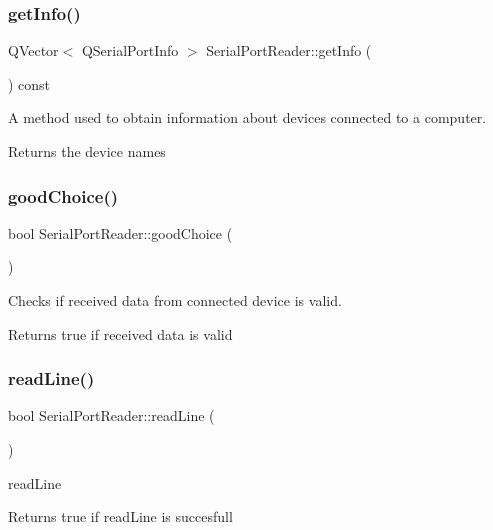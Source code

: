 \subsubsection{get\+Info()}
{\footnotesize\ttfamily Q\+Vector$<$ Q\+Serial\+Port\+Info $>$ Serial\+Port\+Reader\+::get\+Info (\begin{DoxyParamCaption}{ }\end{DoxyParamCaption}) const}



A method used to obtain information about devices connected to a computer. 

\begin{DoxyReturn}{Returns}
the device names 
\end{DoxyReturn}
\mbox{\label{class_serial_port_reader_aba5b7292f941e824467f5b1134f7f15f}} 
\subsubsection{good\+Choice()}
{\footnotesize\ttfamily bool Serial\+Port\+Reader\+::good\+Choice (\begin{DoxyParamCaption}{ }\end{DoxyParamCaption})\hspace{0.3cm}{\ttfamily [private]}}



Checks if received data from connected device is valid. 

\begin{DoxyReturn}{Returns}
true if received data is valid 
\end{DoxyReturn}
\mbox{\label{class_serial_port_reader_a87132b40be9ec8d709def769e14bbf6a}} 
\subsubsection{read\+Line()}
{\footnotesize\ttfamily bool Serial\+Port\+Reader\+::read\+Line (\begin{DoxyParamCaption}{ }\end{DoxyParamCaption})}



read\+Line 

\begin{DoxyReturn}{Returns}
true if read\+Line is succesfull 
\end{DoxyReturn}
\mbox{\label{class_serial_port_reader_a03d89e1219ecadd67bad6a56ac6dfee2}} 
